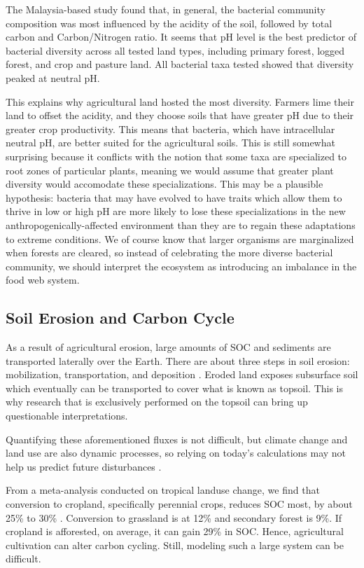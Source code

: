 The Malaysia-based study found that, in general, the bacterial community composition was most influenced by the acidity of the soil, followed by total carbon and Carbon/Nitrogen ratio. It seems that pH level is the best predictor of bacterial diversity across all tested land types, including primary forest, logged forest, and crop and pasture land. All bacterial taxa tested showed that diversity peaked at neutral pH. 

This explains why agricultural land hosted the most diversity. Farmers lime their land to offset the acidity, and they choose soils that have greater pH due to their greater crop productivity. This means that bacteria, which have intracellular neutral pH, are better suited for the agricultural soils. This is still somewhat surprising because it conflicts with the notion that some taxa are specialized to root zones of particular plants, meaning we would assume that greater plant diversity would accomodate these specializations. This may be a plausible hypothesis: bacteria that may have evolved to have traits which allow them to thrive in low or high pH are more likely to lose these specializations in the new anthropogenically-affected environment than they are to regain these adaptations to extreme conditions. We of course know that larger organisms are marginalized when forests are cleared, so instead of celebrating the more diverse bacterial community, we should interpret the ecosystem as introducing an imbalance in the food web system.

\subsection{Soil Erosion and Carbon Cycle}

As a result of agricultural erosion, large amounts of SOC and sediments are transported laterally over the Earth. There are about three steps in soil erosion: mobilization, transportation, and deposition \citep{quinton2010impact}. Eroded land exposes subsurface soil which eventually can be transported to cover what is known as topsoil. This is why research that is exclusively performed on the topsoil can bring up questionable interpretations. 

Quantifying these aforementioned fluxes is not difficult, but climate change and land use are also dynamic processes, so relying on today's calculations may not help us predict future disturbances \citep{heimann2008terrestrial}.

From a meta-analysis conducted on tropical landuse change, we find that conversion to cropland, specifically perennial crops, reduces SOC most, by about 25\% to 30\% \citep{don2011impact}. Conversion to grassland is at 12\% and secondary forest is 9\%. If cropland is afforested, on average, it can gain 29\% in SOC. Hence, agricultural cultivation can alter carbon cycling. Still, modeling such a large system can be difficult.

